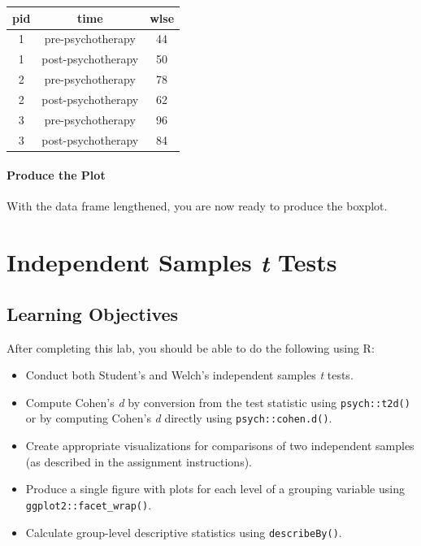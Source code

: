 \documentclass[
]{book}
\providecommand{\tightlist}{%
  \setlength{\itemsep}{0pt}\setlength{\parskip}{0pt}}
\begin{document}
\begin{longtable}[]{@{}ccc@{}}
\toprule
pid & time & wlse \\
\midrule
\endhead
1 & pre-psychotherapy & 44 \\
1 & post-psychotherapy & 50 \\
2 & pre-psychotherapy & 78 \\
2 & post-psychotherapy & 62 \\
3 & pre-psychotherapy & 96 \\
3 & post-psychotherapy & 84 \\
\bottomrule
\end{longtable}

\hypertarget{produce-the-plot}{%
\subsubsection{Produce the Plot}\label{produce-the-plot}}

With the data frame lengthened, you are now ready to produce the boxplot.

\hypertarget{ist}{%
\chapter{\texorpdfstring{Independent Samples \emph{t} Tests}{Independent Samples t Tests}}\label{ist}}

\hypertarget{ist-learning-objectives}{%
\section{Learning Objectives}\label{ist-learning-objectives}}

After completing this lab, you should be able to do the following using R:

\begin{itemize}
\tightlist
\item
  Conduct both Student's and Welch's independent samples \emph{t} tests.
\item
  Compute Cohen's \emph{d} by conversion from the test statistic using \texttt{psych::t2d()} or by computing Cohen's \emph{d} directly using \texttt{psych::cohen.d()}.
\item
  Create appropriate visualizations for comparisons of two independent samples (as described in the assignment instructions).
\item
  Produce a single figure with plots for each level of a grouping variable using \texttt{ggplot2::facet\_wrap()}.
\item
  Calculate group-level descriptive statistics using \texttt{describeBy()}.
\end{itemize}
\end{document}
